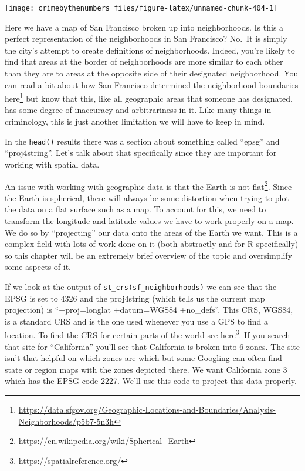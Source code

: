 \documentclass[
]{krantz}
\makeatletter
\newenvironment{Shaded}{\begin{snugshade}}{\end{snugshade}}
\newcommand{\FunctionTok}[1]{\textcolor[rgb]{0,0,0}{#1}}
\newcommand{\NormalTok}[1]{#1}
\newcommand{\SpecialCharTok}[1]{\textcolor[rgb]{0,0,0}{#1}}
\renewcommand{\href}[2]{#2\footnote{\url{#1}}}
\newenvironment{kframe}{%
\medskip{}
\setlength{\fboxsep}{.8em}
 \def\at@end@of@kframe{}%
 \ifinner\ifhmode%
  \def\at@end@of@kframe{\end{minipage}}%
  \begin{minipage}{\columnwidth}%
 \fi\fi%
 \def\FrameCommand##1{\hskip\@totalleftmargin \hskip-\fboxsep
 \colorbox{shadecolor}{##1}\hskip-\fboxsep
     \hskip-\linewidth \hskip-\@totalleftmargin \hskip\columnwidth}%
 \MakeFramed {\advance\hsize-\width
   \@totalleftmargin\z@ \linewidth\hsize
   \@setminipage}}%
 {\par\unskip\endMakeFramed%
 \at@end@of@kframe}
\renewenvironment{Shaded}{\begin{kframe}}{\end{kframe}}
\makeatother
\begin{document}
\begin{Shaded}
\end{Shaded}

\begin{center}\texttt{[image: crimebythenumbers\_files/figure-latex/unnamed-chunk-404-1]} \end{center}

Here we have a map of San Francisco broken up into
neighborhoods. Is this a perfect representation of the
neighborhoods in San Francisco? No.~It is simply the city's
attempt to create definitions of neighborhoods. Indeed,
you're likely to find that areas at the border of
neighborhoods are more similar to each other than they are
to areas at the opposite side of their designated
neighborhood. You can read a bit about how San Francisco
determined the neighborhood boundaries
\href{https://data.sfgov.org/Geographic-Locations-and-Boundaries/Analysis-Neighborhoods/p5b7-5n3h}{here}
but know that this, like all geographic areas that someone
has designated, has some degree of inaccuracy and
arbitrariness in it. Like many things in criminology, this
is just another limitation we will have to keep in mind.

In the \texttt{head()} results there was a section about
something called ``epsg'' and ``proj4string''. Let's talk
about that specifically since they are important for working
with spatial data.

An issue with working with geographic data is that
\href{https://en.wikipedia.org/wiki/Spherical_Earth}{the
Earth is not flat}. Since the Earth is spherical, there will
always be some distortion when trying to plot the data on a
flat surface such as a map. To account for this, we need to
transform the longitude and latitude values we have to work
properly on a map. We do so by ``projecting'' our data onto
the areas of the Earth we want. This is a complex field with
lots of work done on it (both abstractly and for R
specifically) so this chapter will be an extremely brief
overview of the topic and oversimplify some aspects of it.

If we look at the output of
\texttt{st\_crs(sf\_neighborhoods)} we can see that the EPSG
is set to 4326 and the proj4string (which tells us the
current map projection) is ``+proj=longlat +datum=WGS84
+no\_defs''. This CRS, WGS84, is a standard CRS and is the
one used whenever you use a GPS to find a location. To find
the CRS for certain parts of the world see
\href{https://spatialreference.org/}{here}. If you search
that site for ``California'' you'll see that California is
broken into 6 zones. The site isn't that helpful on which
zones are which but some Googling can often find state or
region maps with the zones depicted there. We want
California zone 3 which has the EPSG code 2227. We'll use
this code to project this data properly.
\end{document}
